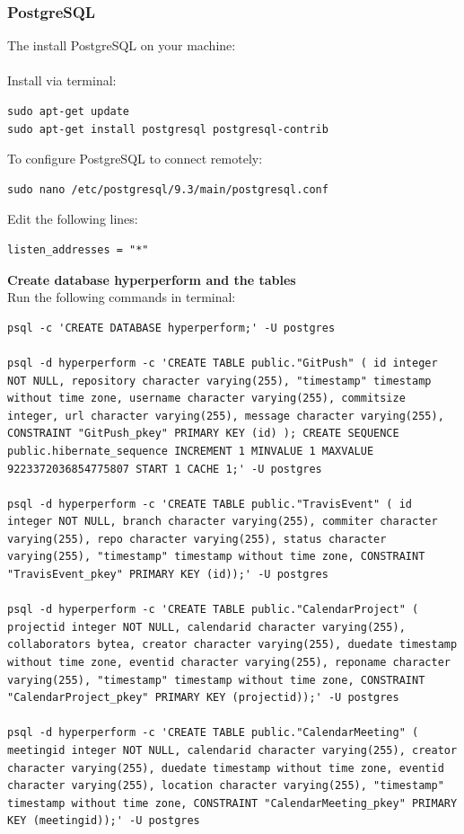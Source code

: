 \documentclass[11pt,a4paper]{article}
\begin{document}
\subsubsection{PostgreSQL}
The install PostgreSQL on your machine: \\\\
Install via terminal:
\begin{lstlisting}
sudo apt-get update
sudo apt-get install postgresql postgresql-contrib
\end{lstlisting}
To configure PostgreSQL to connect remotely:
\begin{lstlisting}
sudo nano /etc/postgresql/9.3/main/postgresql.conf
\end{lstlisting}
Edit the following lines:
\begin{lstlisting}
listen_addresses = "*"
\end{lstlisting}
\pagebreak


\textbf{Create database hyperperform and the tables}\\
Run the following commands in terminal: 
\begin{lstlisting}
psql -c 'CREATE DATABASE hyperperform;' -U postgres

psql -d hyperperform -c 'CREATE TABLE public."GitPush" ( id integer NOT NULL, repository character varying(255), "timestamp" timestamp without time zone, username character varying(255), commitsize integer, url character varying(255), message character varying(255), CONSTRAINT "GitPush_pkey" PRIMARY KEY (id) ); CREATE SEQUENCE public.hibernate_sequence INCREMENT 1 MINVALUE 1 MAXVALUE 9223372036854775807 START 1 CACHE 1;' -U postgres

psql -d hyperperform -c 'CREATE TABLE public."TravisEvent" ( id integer NOT NULL, branch character varying(255), commiter character varying(255), repo character varying(255), status character varying(255), "timestamp" timestamp without time zone, CONSTRAINT "TravisEvent_pkey" PRIMARY KEY (id));' -U postgres

psql -d hyperperform -c 'CREATE TABLE public."CalendarProject" ( projectid integer NOT NULL, calendarid character varying(255), collaborators bytea, creator character varying(255), duedate timestamp without time zone, eventid character varying(255), reponame character varying(255), "timestamp" timestamp without time zone, CONSTRAINT "CalendarProject_pkey" PRIMARY KEY (projectid));' -U postgres

psql -d hyperperform -c 'CREATE TABLE public."CalendarMeeting" ( meetingid integer NOT NULL, calendarid character varying(255), creator character varying(255), duedate timestamp without time zone, eventid character varying(255), location character varying(255), "timestamp" timestamp without time zone, CONSTRAINT "CalendarMeeting_pkey" PRIMARY KEY (meetingid));' -U postgres

\end{lstlisting}
\pagebreak
\end{document}
